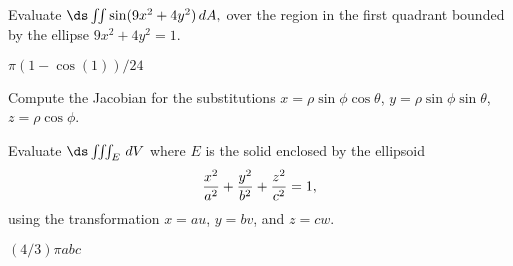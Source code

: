 \begin{enumialphparenastyle}
\begin{ex}
Evaluate $\ds\iint \sin(9x^2 + 4y^2)\,dA,$ over the region
 in the first quadrant bounded by the ellipse $9x^2+4y^2 = 1$.
\begin{sol}
$\pi(1-\cos(1))/24$
\end{sol}
\end{ex}

\begin{ex}
Compute the Jacobian for the substitutions 
$x=\rho\sin\phi\cos\theta$, $y=\rho\sin\phi\sin\theta$, 
$z=\rho\cos\phi$.
\end{ex}

\begin{ex}
Evaluate $\ds\iiint_E\,dV$ where $E$ is the solid
enclosed by the ellipsoid
$${x^2\over a^2} + {y^2\over b^2} + {z^2\over c^2} = 1,$$ 
using the transformation $x=au$, $y=bv$, and $z=cw$.
\begin{sol}
$(4/3)\pi abc$
\end{sol}
\end{ex}

\end{enumialphparenastyle}
